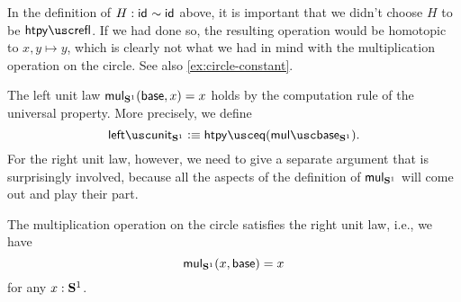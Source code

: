 \begin{rmk}
  In the definition of $H:\mathsf{id}_{}\sim\mathsf{id}_{}$ above, it is important that we didn't choose $H$ to be $\htpyrefl$. If we had done so, the resulting operation would be homotopic to $x,y\mapsto y$, which is clearly not what we had in mind with the multiplication operation on the circle. See also \cref{ex:circle-constant}.
\end{rmk}


The left unit law $\mathsf{mul}_{\mathbf{S}^{1}}(\mathsf{base},x)=x$ holds by the computation rule of the universal property. More precisely, we define
\begin{equation*}
  \leftunit_{\sphere{1}}\defeq \htpyeq(\mulcirclebase).
\end{equation*}
For the right unit law, however, we need to give a separate argument that is surprisingly involved, because all the aspects of the definition of $\mathsf{mul}_{\mathbf{S}^{1}}$ will come out and play their part.

\begin{thm}
  The multiplication operation on the circle satisfies the right unit law, i.e., we have
  \begin{equation*}
    \mathsf{mul}_{\mathbf{S}^{1}}(x,\mathsf{base})=x
  \end{equation*}
  for any $x:\mathbf{S}^{1}$.
\end{thm}

